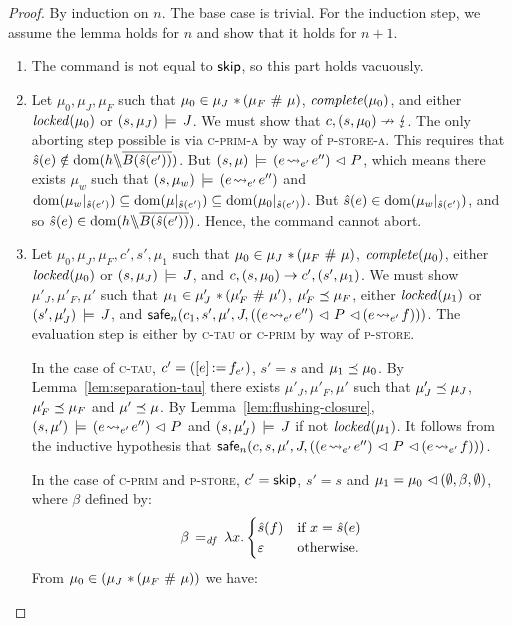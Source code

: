\documentclass[11pt]{report}
\begin{document}
\begin{proof}
    By induction on $n$. The base case is trivial. For the induction step, we assume the lemma holds for $n$ and show that it holds for $n+1$.

    \begin{enumerate}
        \item The command is not equal to $\operatorname{\mathsf{skip}}$, so this part holds vacuously. 

        \item Let $\mu_0,\mu_J,\mu_F$ such that $\mu_0 \in \mu_J \operatorname{\,\ast\,} (\mu_F \operatorname{\,\#\,} \mu)$, $\mathit{complete}(\mu_0)$, and either $\mathit{locked}(\mu_0)$ or $(s,\mu_J) \,\models\, J$. We must show that $c,(s,\mu_0) \nrightarrow \lightning$. The only aborting step possible is via \textsc{c-prim-a} by way of \textsc{p-store-a}. This requires that $\hat{s}(e) \notin \operatorname{\mathrm{dom}}(h \backslash\!\!\backslash \overline{B(\hat{s}(e'))})$. But $(s,\mu) \,\models\, (e \!\leadsto_{e'}\! e'') \operatorname{\,\vartriangleleft\,} P$, which means there exists $\mu_w$ such that $(s,\mu_w) \,\models\, (e \!\leadsto_{e'}\! e'')$ and $\operatorname{\mathrm{dom}}(\mu_w |_{\hat{s}(e')}) \subseteq \operatorname{\mathrm{dom}}(\mu |_{\hat{s}(e')}) \subseteq \operatorname{\mathrm{dom}}(\mu_0 |_{\hat{s}(e')})$. But $\hat{s}(e) \in \operatorname{\mathrm{dom}}(\mu_w |_{\hat{s}(e')})$, and so $\hat{s}(e) \in \operatorname{\mathrm{dom}}(h \backslash\!\!\backslash \overline{B(\hat{s}(e'))})$. Hence, the command cannot abort.

        \item Let $\mu_0,\mu_J,\mu_F,c',s',\mu_1$ such that $\mu_0 \in \mu_J \operatorname{\,\ast\,} (\mu_F \operatorname{\,\#\,} \mu)$, $\mathit{complete}(\mu_0)$, either $\mathit{locked}(\mu_0)$ or $(s,\mu_J) \,\models\, J$, and $c,(s,\mu_0) \rightarrow c',(s',\mu_1)$. We must show $\mu'_J,\mu'_F,\mu'$ such that $\mu_1 \in \mu'_J \operatorname{\,\ast\,} (\mu'_F \operatorname{\,\#\,} \mu')$, $\mu'_F \preceq \mu_F$, either $\mathit{locked}(\mu_1)$ or $(s',\mu'_J) \,\models\, J$, and $\mathsf{safe}_{n}(c_1,s',\mu',J,\left((e \!\leadsto_{e'}\! e'') \operatorname{\,\vartriangleleft\,} P \operatorname{\,\vartriangleleft\,} (e \!\leadsto_{e'}\! f)\right))$. The evaluation step is either by \textsc{c-tau} or \textsc{c-prim} by way of \textsc{p-store}. 

        In the case of \textsc{c-tau}, $c' = (\left[ e \right] \operatorname{:\!=} f_{e'})$, $s' = s$ and $\mu_1 \preceq \mu_0$. By Lemma~\ref{lem:separation-tau} there exists $\mu'_J,\mu'_F,\mu'$ such that $\mu'_J \preceq \mu_J$, $\mu'_F \preceq \mu_F$ and $\mu' \preceq \mu$. By Lemma~\ref{lem:flushing-closure}, $(s,\mu') \,\models\, (e \!\leadsto_{e'}\! e'') \operatorname{\,\vartriangleleft\,} P$ and $(s,\mu'_J) \,\models\, J$ if not $\mathit{locked}(\mu_1)$. It follows from the inductive hypothesis that $\mathsf{safe}_{n}(c,s,\mu',J,((e \!\leadsto_{e'}\! e'') \operatorname{\,\vartriangleleft\,} P \operatorname{\,\vartriangleleft\,} (e \!\leadsto_{e'}\! f)))$. 

        In the case of \textsc{c-prim} and \textsc{p-store}, $c' = \operatorname{\mathsf{skip}}$, $s' = s$ and $\mu_1 = \mu_0 \operatorname{\,\vartriangleleft\,} (\operatorname{\emptyset},\beta,\operatorname{\emptyset})$, where $\beta$ defined by: \[ \beta \operatorname{\;=_{\mathit{df}}\;} \lambda x . \begin{cases}
          \hat{s}(f) & \text{if $x = \hat{s}(e)$} \\ 
          \varepsilon & \text{otherwise.}
        \end{cases}\] From $\mu_0 \in (\mu_J \operatorname{\,\ast\,} (\mu_F \operatorname{\,\#\,} \mu))$ we have:        
        \Calc{ 

}
\end{enumerate}
\end{proof}
\end{document}
